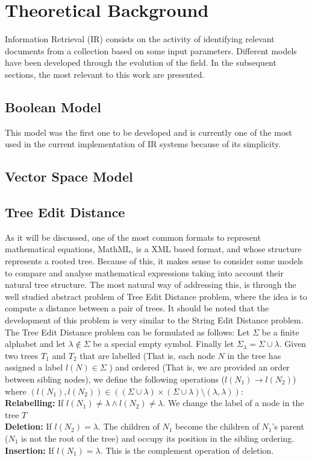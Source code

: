 \chapter{Theoretical Background}
\label{chapter-theoretical_background}
Information Retrieval (IR) consists on the activity of identifying relevant documents from a collection based on some input parameters.
Different models have been developed through the evolution of the field. In the subsequent sections, the most relevant to this work are presented.

\section{Boolean Model}
This model was the first one to be developed and is currently one of the most used in the current implementation of IR systems because of its simplicity.

\section{Vector Space Model}

\section{Tree Edit Distance}
As it will be discussed, one of the most common formats to represent mathematical equations, MathML, is a XML based format, and whose structure represents a rooted tree. Because of this, it makes sense to consider some models to compare and analyse mathematical expressions taking into account their natural tree structure. The most natural way of addressing this, is through the well studied abstract problem of Tree Edit Distance problem, where the idea is to compute a distance between a pair of trees. It should be noted that the development of this problem is very similar to the String Edit Distance problem.
The Tree Edit Distance problem can be formulated as follows:
Let $\Sigma$ be a finite alphabet and let $\lambda \notin \Sigma$ be a special empty symbol. Finally let $\Sigma_\lambda = \Sigma \cup \lambda$. 
Given two trees $T_1$ and $T_2$ that are labelled (That is, each node $N$ in the tree has assigned a label $l(N) \in \Sigma$ ) and ordered (That is, we are provided an order between sibling nodes), we define the following operations ($l(N_1) \rightarrow l(N_2)$) where $(l(N_1),l(N_2)) \in ((\Sigma \cup \lambda)\times(\Sigma \cup \lambda)\setminus(\lambda,\lambda)) $: \\
\textbf{Relabelling:} If $l(N_1) \neq \lambda \wedge l(N_2) \neq \lambda $. We change the label of a node in the tree $T$ \\
\textbf{Deletion:} If $l(N_2) = \lambda $. The children of $N_1$ become the children of $N_1$'s parent ($N_1$ is not the root of the tree) and occupy its position in the sibling ordering. \\
\textbf{Insertion:} If $l(N_1) = \lambda $. This is the complement operation of deletion. \\

